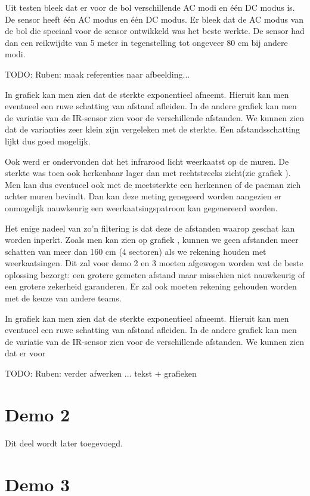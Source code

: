 \documentclass[12pt,a4paper]{report}
\begin{document}
Uit testen bleek dat er voor de bol verschillende AC modi en \'e\'en DC modus is. De sensor heeft \'e\'en AC modus en \'e\'en DC modus. Er bleek dat de AC modus van de bol die speciaal voor de sensor ontwikkeld was het beste werkte. De sensor had dan een reikwijdte van 5 meter in tegenstelling tot ongeveer 80 cm bij andere modi.

TODO: Ruben: maak referenties naar afbeelding...

In grafiek kan men zien dat de sterkte exponentieel afneemt. Hieruit kan men eventueel een ruwe schatting van afstand afleiden. In de andere grafiek kan men de variatie van de IR-sensor zien voor de verschillende afstanden. We kunnen zien dat de varianties zeer klein zijn vergeleken met de sterkte. Een afstandsschatting lijkt dus goed mogelijk.

Ook werd er ondervonden dat het infrarood licht weerkaatst op de muren. De sterkte was toen ook herkenbaar lager dan met rechtstreeks zicht(zie grafiek ). Men kan dus eventueel ook met de meetsterkte een herkennen of de pacman zich achter muren bevindt. Dan kan deze meting genegeerd worden aangezien er onmogelijk nauwkeurig een weerkaatsingspatroon kan gegenereerd worden. 

Het enige nadeel van zo'n filtering is dat deze de afstanden waarop geschat kan worden inperkt. Zoals men kan zien op grafiek , kunnen we geen afstanden meer schatten van meer dan 160 cm (4 sectoren) als we rekening houden met weerkaatsingen. Dit zal voor demo 2 en 3 moeten afgewogen worden wat de beste oplossing bezorgt: een grotere gemeten afstand maar misschien niet nauwkeurig of een grotere zekerheid garanderen. Er zal ook moeten rekening gehouden worden met de keuze van andere teams. 

In grafiek kan men zien dat de sterkte exponentieel afneemt. Hieruit kan men eventueel een ruwe schatting van afstand afleiden. In de andere grafiek kan men de variatie van de IR-sensor zien voor de verschillende afstanden. We kunnen zien dat er voor 

TODO: Ruben: verder afwerken ... tekst + grafieken

\section{Demo 2}

Dit deel wordt later toegevoegd.

\section{Demo 3}
\end{document}
